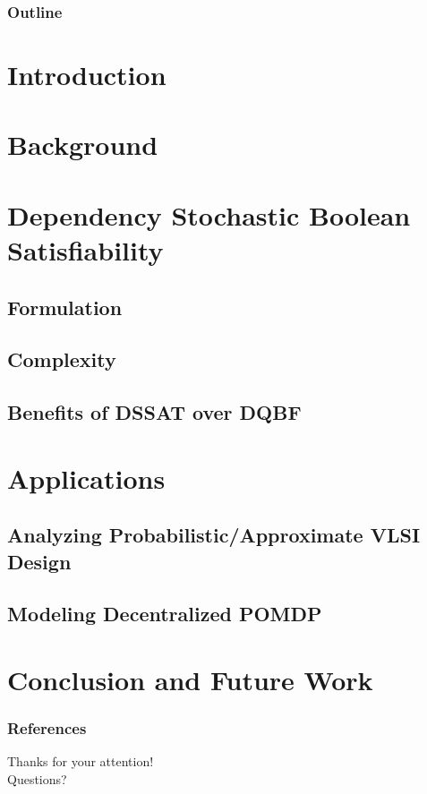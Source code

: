 


\frame{\titlepage}

\begin{frame}
  \frametitle{Outline}
  \tableofcontents
\end{frame}

\section{Introduction}


\section{Background}


\section{Dependency Stochastic Boolean Satisfiability}
\subsection{Formulation}

\subsection{Complexity}

\subsection{Benefits of DSSAT over DQBF}


\section{Applications}
\subsection{Analyzing Probabilistic/Approximate VLSI Design}

\subsection{Modeling Decentralized POMDP}


\section{Conclusion and Future Work}


\begin{frame}[allowframebreaks]
  \frametitle{References}
  
  
\end{frame}

\begin{frame}
  \centering\Large
  Thanks for your attention!\\
  Questions?
\end{frame}

